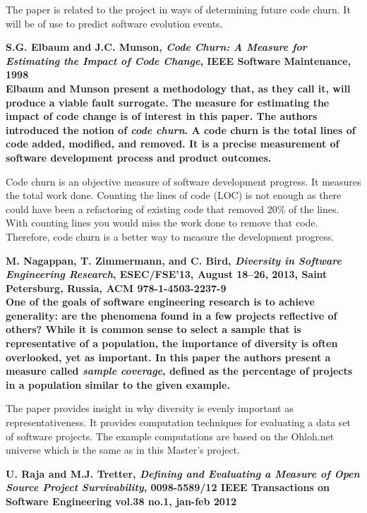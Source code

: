 \begin{thebibliography}{99}
		The paper is related to the project in ways of determining future code churn.
		It will be of use to predict software evolution events.
		
	 \bfseries{S.G. Elbaum and J.C. Munson, \emph{Code Churn: A
		Measure for Estimating the Impact of Code Change}, IEEE Software Maintenance,
		1998}\rm
		\\
		
		Elbaum and Munson present a methodology that, as they call it, will produce a
		viable fault surrogate. The measure for estimating the impact of code change
		is of interest in this paper. The authors introduced the notion of \emph{code
		churn}. A code churn is the total lines of code added, modified, and removed.
		It is a precise measurement of software development process and product
		outcomes.

		Code churn is an objective measure of software development progress. It
		measures the total work done. Counting the lines of code (LOC) is not enough
		as there could have been a refactoring of existing code that removed 20\% of
		the lines. With counting lines you would miss the work done to remove that
		code. Therefore, code churn is a better way to measure the development
		progress.

	 \bfseries{M. Nagappan, T. Zimmermann, and C. Bird,
		\emph{Diversity in Software Engineering Research}, ESEC/FSE'13, August 18–26,
		2013, Saint Petersburg, Russia, ACM 978-1-4503-2237-9}\rm
		\\
		
		One of the goals of software engineering research is to achieve generality:
		are the phenomena found in a few projects reflective of others? While it is
		common sense to select a sample that is representative of a population, the
		importance of diversity is often overlooked, yet as important. In this paper
		the authors present a measure called \emph{sample coverage}, defined as the
		percentage of projects in a population similar to the given example.
		
		The paper provides insight in why diversity is evenly important as
		representativeness. It provides computation techniques for evaluating a data
		set of software projects. The example computations are based on the Ohloh.net
		universe which is the same as in this Master's project.

	 \bfseries{U. Raja and M.J. Tretter, \emph{Defining and
		Evaluating a Measure of Open Source Project Survivability}, 0098-5589/12 IEEE
		Transactions on Software Engineering vol.38 no.1, jan-feb 2012}\rm
		\\
		

\end{thebibliography}
